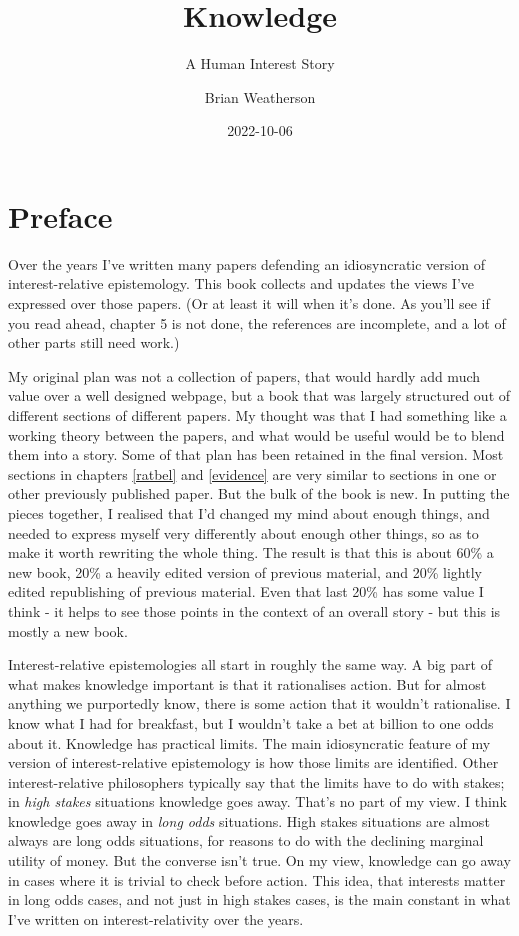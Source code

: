 \documentclass[
  11pt,
]{book}
\title{Knowledge}
\subtitle{A Human Interest Story}
\author{Brian Weatherson}
\date{2022-10-06}
\begin{document}
\maketitle

{
\setcounter{tocdepth}{1}
\tableofcontents
}
\hypertarget{Preface}{%
\chapter*{Preface}\label{Preface}}

\fancyhf{}
\fancyhead[R]{\thepage}

Over the years I've written many papers defending an idiosyncratic version of interest-relative epistemology. This book collects and updates the views I've expressed over those papers. (Or at least it will when it's done. As you'll see if you read ahead, chapter 5 is not done, the references are incomplete, and a lot of other parts still need work.)

My original plan was not a collection of papers, that would hardly add much value over a well designed webpage, but a book that was largely structured out of different sections of different papers. My thought was that I had something like a working theory between the papers, and what would be useful would be to blend them into a story. Some of that plan has been retained in the final version. Most sections in chapters \ref{ratbel} and \ref{evidence} are very similar to sections in one or other previously published paper. But the bulk of the book is new. In putting the pieces together, I realised that I'd changed my mind about enough things, and needed to express myself very differently about enough other things, so as to make it worth rewriting the whole thing. The result is that this is about 60\% a new book, 20\% a heavily edited version of previous material, and 20\% lightly edited republishing of previous material. Even that last 20\% has some value I think - it helps to see those points in the context of an overall story - but this is mostly a new book.

Interest-relative epistemologies all start in roughly the same way. A big part of what makes knowledge important is that it rationalises action. But for almost anything we purportedly know, there is some action that it wouldn't rationalise. I know what I had for breakfast, but I wouldn't take a bet at billion to one odds about it. Knowledge has practical limits. The main idiosyncratic feature of my version of interest-relative epistemology is how those limits are identified. Other interest-relative philosophers typically say that the limits have to do with stakes; in \emph{high stakes} situations knowledge goes away. That's no part of my view. I think knowledge goes away in \emph{long odds} situations. High stakes situations are almost always are long odds situations, for reasons to do with the declining marginal utility of money. But the converse isn't true. On my view, knowledge can go away in cases where it is trivial to check before action. This idea, that interests matter in long odds cases, and not just in high stakes cases, is the main constant in what I've written on interest-relativity over the years.
\end{document}
